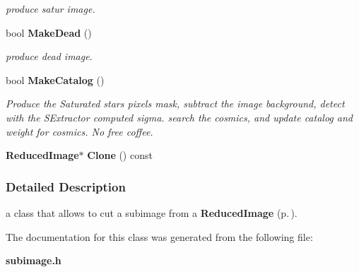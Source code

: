\begin{CompactItemize}
\begin{CompactList}\small\item\em produce satur image.\item\end{CompactList}\item 
{}
bool {\bf Make\-Dead} ()\label{class_subimage_a7}

\begin{CompactList}\small\item\em produce dead image.\item\end{CompactList}\item 
{}
bool {\bf Make\-Catalog} ()\label{class_subimage_a8}

\begin{CompactList}\small\item\em Produce the Saturated stars pixels mask, subtract the image background, detect with the SExtractor computed sigma. search the cosmics, and update catalog and weight for cosmics. No free coffee.\item\end{CompactList}\item 
{}
{\bf Reduced\-Image}$\ast$ {\bf Clone} () const\label{class_subimage_a9}

\end{CompactItemize}


\subsubsection{Detailed Description}
a class that allows to cut a subimage from a {\bf Reduced\-Image} {\rm (p.\,\pageref{class_reducedimage})}.



The documentation for this class was generated from the following file:\begin{CompactItemize}
\item 
{\bf subimage.h}\end{CompactItemize}
